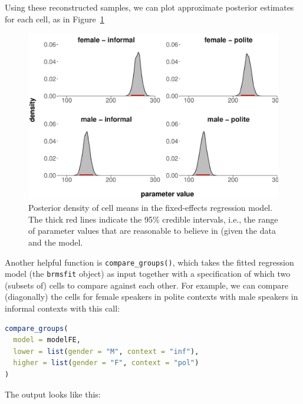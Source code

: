 \documentclass[nobib]{tufte-handout}
\begin{document}
\vspace*{-0.5cm}

\noindent Using these reconstructed samples, we can plot approximate posterior estimates for each cell, as in Figure~\ref{fig:Posteriors_cell_means}

\begin{figure}
  \centering
  \includegraphics[width=\textwidth]{pics/posterior_density_cell_means.pdf}
  \caption[Posteriors over cell means in fixed-effects model]{Posterior density of cell means
    in the fixed-effects regression model. The thick red lines indicate the 95\% credible
    intervals, i.e., the range of parameter values that are reasonable to believe in (given the data and the model.}
  \label{fig:Posteriors_cell_means}
\end{figure}


Another helpful function is \texttt{compare\_groups()}, which takes the fitted regression model (the \texttt{brmsfit} object) as input together with a specification of which two (subsets of) cells to compare
against each other. For example, we can compare (diagonally) the cells for female speakers in
polite contexts with male speakers in informal contexts with this call:

\begin{minipage}[]{1.3\textwidth}
\begin{lstlisting}[language=R]
compare_groups(
  model = modelFE, 
  lower = list(gender = "M", context = "inf"),
  higher = list(gender = "F", context = "pol")
)
\end{lstlisting}
\end{minipage}

The output looks like this:
\end{document}

